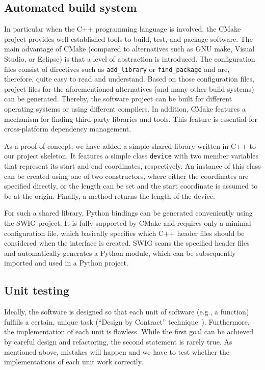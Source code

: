 \documentclass[@CLASSOPTIONS@]{tumarticle}
\begin{document}
\subsection{Automated build system}

In particular when the C++ programming language is involved, the CMake
project provides well-established tools to build, test, and package software.
The main advantage of CMake (compared to alternatives such as GNU make,
Visual Studio, or Eclipse) is that a level of abstraction is introduced. The
configuration files consist of directives such as \texttt{add\_library} or
\texttt{find\_package} and are, therefore, quite easy to read and understand.
Based on those configuration files, project files for the aforementioned
alternatives (and many other build systems) can be generated. Thereby, the
software project can be built for different operating systems or using
different compilers. In addition, CMake features a mechanism for finding
third-party libraries and tools. This feature is essential for
cross-platform dependency management.

As a proof of concept, we have added a simple shared library written in C++
to our project skeleton. It features a simple class \texttt{device} with two
member variables that represent its start and end coordinates, respectively.
An instance of this class can be created using one of two constructors, where
either the coordinates are specified directly, or the length can be set and
the start coordinate is assumed to be at the origin. Finally, a method
returns the length of the device.

For such a shared library, Python bindings can be generated conveniently
using the SWIG project. It is fully supported by CMake and requires only a
minimal configuration file, which basically specifies which C++ header files
should be considered when the interface is created. SWIG scans the specified
header files and automatically generates a Python module, which can be
subsequently imported and used in a Python project.

\subsection{Unit testing}

Ideally, the software is designed so that each unit of software (e.g., a
function) fulfills a certain, unique task (``Design by Contract''
technique~\cite{hunt1999pragmatic}). Furthermore, the implementation of each
unit is flawless. While the first goal can be achieved by careful design and
refactoring, the second statement is rarely true. As mentioned above,
mistakes will happen and we have to test whether the implementations of each
unit work correctly.
\end{document}
